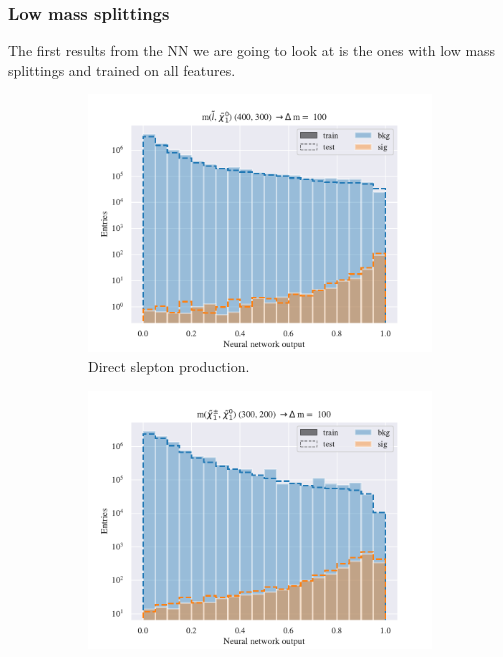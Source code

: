 \subsubsection{Low mass splittings}
The first results from the NN we are going to look at is the ones with low mass splittings and trained on all features. 

\begin{figure}[H]
    \centering
    \begin{subfigure}[t!]{0.49\textwidth}
        \includegraphics[width = \textwidth]{Figures/SlepSlep/ML/NN/All_level/Low/scaled_train_test_395984.pdf}
        \caption{Direct slepton production.}
        \label{fig:SlepslepNNLow}
    \end{subfigure}
    \begin{subfigure}[t!]{0.49\textwidth}
        \includegraphics[width = \textwidth]{Figures/SlepSnu/NN/All_level/Low/scaled_train_test_397115.pdf}

\end{subfigure}
\end{figure}
